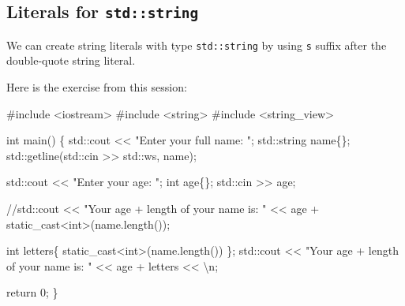 \documentclass[
  letterpaper,
  DIV=11,
  numbers=noendperiod]{scrreprt}
\newenvironment{Shaded}{\begin{snugshade}}{\end{snugshade}}
\newcommand{\CommentTok}[1]{\textcolor[rgb]{0.37,0.37,0.37}{#1}}
\newcommand{\DecValTok}[1]{\textcolor[rgb]{0.68,0.00,0.00}{#1}}
\newcommand{\ErrorTok}[1]{\textcolor[rgb]{0.68,0.00,0.00}{#1}}
\newcommand{\FunctionTok}[1]{\textcolor[rgb]{0.28,0.35,0.67}{#1}}
\newcommand{\NormalTok}[1]{\textcolor[rgb]{0.00,0.23,0.31}{#1}}
\newcommand{\SpecialCharTok}[1]{\textcolor[rgb]{0.37,0.37,0.37}{#1}}
\newcommand{\StringTok}[1]{\textcolor[rgb]{0.13,0.47,0.30}{#1}}
\begin{document}
\hypertarget{literals-for-stdstring}{%
\subsection{\texorpdfstring{Literals for
\texttt{std::string}}{Literals for std::string}}\label{literals-for-stdstring}}

We can create string literals with type \texttt{std::string} by using
\texttt{s} suffix after the double-quote string literal.

Here is the exercise from this session:

\begin{Shaded}
\begin{Highlighting}[]
\CommentTok{\#include \textless{}iostream\textgreater{}}
\CommentTok{\#include \textless{}string\textgreater{}}
\CommentTok{\#include \textless{}string\_view\textgreater{}}

\NormalTok{int }\FunctionTok{main}\NormalTok{()}
\NormalTok{\{}
\NormalTok{    std}\SpecialCharTok{::}\NormalTok{cout }\SpecialCharTok{\textless{}}\ErrorTok{\textless{}} \StringTok{"Enter your full name: "}\NormalTok{;}
\NormalTok{    std}\SpecialCharTok{::}\NormalTok{string name\{\};}
\NormalTok{    std}\SpecialCharTok{::}\FunctionTok{getline}\NormalTok{(std}\SpecialCharTok{::}\NormalTok{cin }\SpecialCharTok{\textgreater{}}\ErrorTok{\textgreater{}}\NormalTok{ std}\SpecialCharTok{::}\NormalTok{ws, name);}

\NormalTok{    std}\SpecialCharTok{::}\NormalTok{cout }\SpecialCharTok{\textless{}}\ErrorTok{\textless{}} \StringTok{"Enter your age: "}\NormalTok{;}
\NormalTok{    int age\{\};}
\NormalTok{    std}\SpecialCharTok{::}\NormalTok{cin }\SpecialCharTok{\textgreater{}}\ErrorTok{\textgreater{}}\NormalTok{ age;}

    \SpecialCharTok{/}\ErrorTok{/}\NormalTok{std}\SpecialCharTok{::}\NormalTok{cout }\SpecialCharTok{\textless{}}\ErrorTok{\textless{}} \StringTok{"Your age + length of your name is: "} \SpecialCharTok{\textless{}}\ErrorTok{\textless{}}\NormalTok{ age }\SpecialCharTok{+}\NormalTok{ static\_cast}\SpecialCharTok{\textless{}}\NormalTok{int}\SpecialCharTok{\textgreater{}}\NormalTok{(}\FunctionTok{name.length}\NormalTok{());}

\NormalTok{    int letters\{ static\_cast}\SpecialCharTok{\textless{}}\NormalTok{int}\SpecialCharTok{\textgreater{}}\NormalTok{(}\FunctionTok{name.length}\NormalTok{()) \};}
\NormalTok{    std}\SpecialCharTok{::}\NormalTok{cout }\SpecialCharTok{\textless{}}\ErrorTok{\textless{}} \StringTok{"Your age + length of your name is: "} \SpecialCharTok{\textless{}}\ErrorTok{\textless{}}\NormalTok{ age }\SpecialCharTok{+}\NormalTok{ letters }\SpecialCharTok{\textless{}}\ErrorTok{\textless{}} \StringTok{\textquotesingle{}}\SpecialCharTok{\textbackslash{}n}\StringTok{\textquotesingle{}}\NormalTok{;}
    
\NormalTok{  return }\DecValTok{0}\NormalTok{;}
\NormalTok{\}}
\end{Highlighting}
\end{Shaded}
\end{document}
